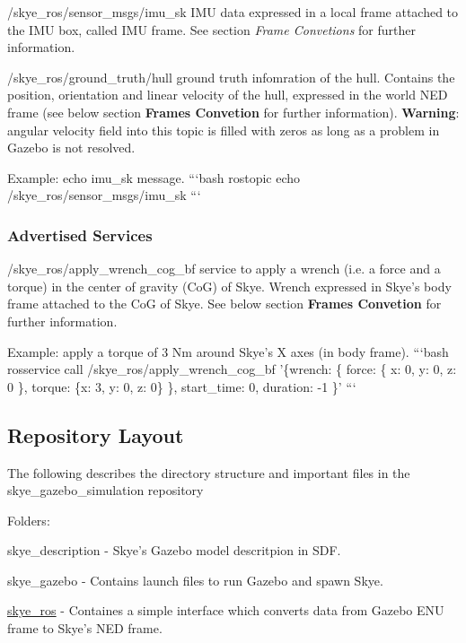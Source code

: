 {\ttfamily 
\begin{DoxyItemize}
\item /skye\-\_\-ros/sensor\-\_\-msgs/imu\-\_\-sk I\-M\-U data expressed in a local frame attached to the I\-M\-U box, called I\-M\-U frame. See section {\itshape Frame Convetions} for further information.
\item /skye\-\_\-ros/ground\-\_\-truth/hull ground truth infomration of the hull. Contains the position, orientation and linear velocity of the hull, expressed in the world N\-E\-D frame (see below section {\bfseries Frames Convetion} for further information). {\bfseries Warning}\-: angular velocity field into this topic is filled with zeros as long as a problem in Gazebo is not resolved.
\end{DoxyItemize}}

{\ttfamily Example\-: echo imu\-\_\-sk message. ```bash rostopic echo /skye\-\_\-ros/sensor\-\_\-msgs/imu\-\_\-sk ```}

{\ttfamily \subsubsection*{Advertised Services}}

{\ttfamily 
\begin{DoxyItemize}
\item /skye\-\_\-ros/apply\-\_\-wrench\-\_\-cog\-\_\-bf service to apply a wrench (i.\-e. a force and a torque) in the center of gravity (Co\-G) of Skye. Wrench expressed in Skye's body frame attached to the Co\-G of Skye. See below section {\bfseries Frames Convetion} for further information.
\end{DoxyItemize}}

{\ttfamily Example\-: apply a torque of 3 Nm around Skye's X axes (in body frame). ```bash rosservice call /skye\-\_\-ros/apply\-\_\-wrench\-\_\-cog\-\_\-bf '\{wrench\-: \{ force\-: \{ x\-: 0, y\-: 0, z\-: 0 \}, torque\-: \{x\-: 3, y\-: 0, z\-: 0\} \}, start\-\_\-time\-: 0, duration\-: -\/1 \}' ``` \subsection*{Repository Layout}}

{\ttfamily  The following describes the directory structure and important files in the skye\-\_\-gazebo\-\_\-simulation repository}

{\ttfamily Folders\-:}

{\ttfamily 
\begin{DoxyItemize}
\item skye\-\_\-description -\/ Skye's Gazebo model descritpion in S\-D\-F.
\item skye\-\_\-gazebo -\/ Contains launch files to run Gazebo and spawn Skye.
\item \hyperlink{namespaceskye__ros}{skye\-\_\-ros} -\/ Containes a simple interface which converts data from Gazebo E\-N\-U frame to Skye's N\-E\-D frame.
\end{DoxyItemize}}

